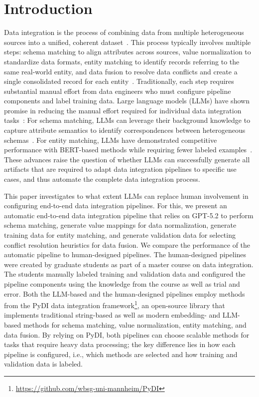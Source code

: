 \section{Introduction}
\label{sec:introduction}
Data integration is the process of combining data from multiple heterogeneous sources into a unified, coherent dataset~\cite{doan2012principles,naumann2006dataFusionThreeSteps,khatiwada2022integrating}. This process typically involves multiple steps: schema matching to align attributes across sources, value normalization to standardize data formats, entity matching to identify records referring to the same real-world entity, and data fusion to resolve data conflicts and create a single consolidated record for each entity~\cite{dong2009dataFusion,naumann2006dataFusionThreeSteps}. Traditionally, each step requires substantial manual effort from data engineers who must configure pipeline components and label training data.
Large language models (LLMs) have shown promise in reducing the manual effort required for individual data integration tasks~\cite{freire2025llmDataDiscoveryIntegration}: For schema matching, LLMs can leverage their background knowledge to capture attribute semantics to identify correspondences between heterogeneous schemas~\cite{narayan2022can, zhang2023schema,liu2025magneto}. For entity matching, LLMs have demonstrated competitive performance with BERT-based methods while requiring fewer labeled examples~\cite{peeters2024entity}. These advances raise the question of whether LLMs can successfully generate all artifacts that are required to adapt data integration pipelines to specific use cases, and thus automate the complete data integration process.

This paper investigates to what extent LLMs can replace human involvement in configuring end-to-end data integration pipelines. For this, we present an automatic end-to-end data integration pipeline that relies on GPT-5.2 to perform schema matching, generate value mappings for data normalization, generate training data for entity matching, and generate validation data for selecting conflict resolution heuristics for data fusion. We compare the performance of the automatic pipeline to human-designed pipelines. The human-designed pipelines were created by graduate students as part of a master course on data integration. The students manually labeled training and validation data and configured the pipeline components using the knowledge from the course as well as trial and error. Both the LLM-based and the human-designed pipelines employ methods from the PyDI data integration framework\footnote{\url{https://github.com/wbsg-uni-mannheim/PyDI}}, an open-source library that implements traditional string-based as well as modern embedding- and LLM-based methods for schema matching, value normalization, entity matching, and data fusion. By relying on PyDI, both pipelines can choose scalable methods for tasks that require heavy data processing; the key difference lies in how each pipeline is configured, i.e., which methods are selected and how training and validation data is labeled.

